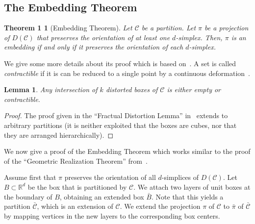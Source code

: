 \documentclass[12pt]{article}
\newcommand{\R}{\mathbb{R}}
\newcommand{\partition}{\mathcal{C}}
\newtheorem*{embtheorem}{Theorem 1}
\newtheorem{lemma}[theorem]{Lemma}
\begin{document}
\begin{appendix}


\section{The Embedding Theorem}
\label{app:embedding}


\begin{embtheorem}[Embedding Theorem]
Let $\partition$ be a partition.
Let $\pi$ be a projection of $D(\partition)$ that preserves
the orientation of at least one $d$-simplex.
Then, $\pi$ is an embedding if and only if 
it preserves the orientation of each $d$-simplex.
\end{embtheorem}

We give some more details about its proof which is based on~\cite{ek-freudenthal}.
A set is called \emph{contractible} if it is can be reduced to a single point
by a continuous deformation~\cite{hatcher}.

\begin{lemma}\label{lem:fractual_distortion}
Any intersection of $k$ distorted boxes of $\partition$ is either empty or contractible.
\end{lemma}
\begin{proof}
The proof given in the ``Fractual Distortion Lemma'' in~\cite{ek-freudenthal}
extends to arbitrary partitions (it is neither exploited that the boxes are cubes, nor
that they are arranged hierarchically).
\end{proof}

We now give a proof of the Embedding Theorem which works similar to
the proof of the ``Geometric Realization Theorem'' from~\cite{ek-freudenthal}.

Assume first that $\pi$ preserves the orientation of all $d$-simplices of $D(\partition)$.
Let $B\subset\R^d$ be the box that is partitioned by $\partition$. 
We attach two layers of unit boxes at the boundary of $B$, obtaining an extended box $\bar{B}$.
Note that this yields a partition $\bar{\partition}$, which is an extension of $\partition$.
We extend the projection $\pi$ of $\partition$ to $\bar{\pi}$ of $\bar{\partition}$ 
by mapping vertices in the new layers to the corresponding box centers.


\end{appendix}
\end{document}

